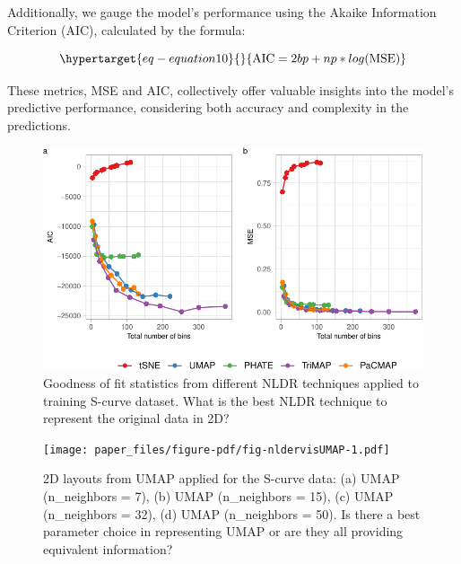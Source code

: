 \documentclass[
  12pt]{article}
\begin{document}
Additionally, we gauge the model's performance using the Akaike
Information Criterion (AIC), calculated by the formula:

\begin{equation}\protect\hypertarget{eq-equation10}{}{
\text{AIC} = 2bp + np * log(\text{MSE})
}\label{eq-equation10}\end{equation}

These metrics, MSE and AIC, collectively offer valuable insights into
the model's predictive performance, considering both accuracy and
complexity in the predictions.

\begin{figure}

{\centering \includegraphics[width=1\textwidth,height=\textheight]{paper_files/figure-pdf/fig-diagnosticpltScurve-1.pdf}

}

\caption{\label{fig-diagnosticpltScurve}Goodness of fit statistics from
different NLDR techniques applied to training S-curve dataset. What is
the best NLDR technique to represent the original data in 2D?}

\end{figure}

\begin{figure}

{\centering \texttt{[image: paper\_files/figure-pdf/fig-nldervisUMAP-1.pdf]}

}

\caption{\label{fig-nldervisUMAP}2D layouts from UMAP applied for the
S-curve data: (a) UMAP (n\_neighbors = 7), (b) UMAP (n\_neighbors = 15),
(c) UMAP (n\_neighbors = 32), (d) UMAP (n\_neighbors = 50). Is there a
best parameter choice in representing UMAP or are they all providing
equivalent information?}

\end{figure}
\end{document}
